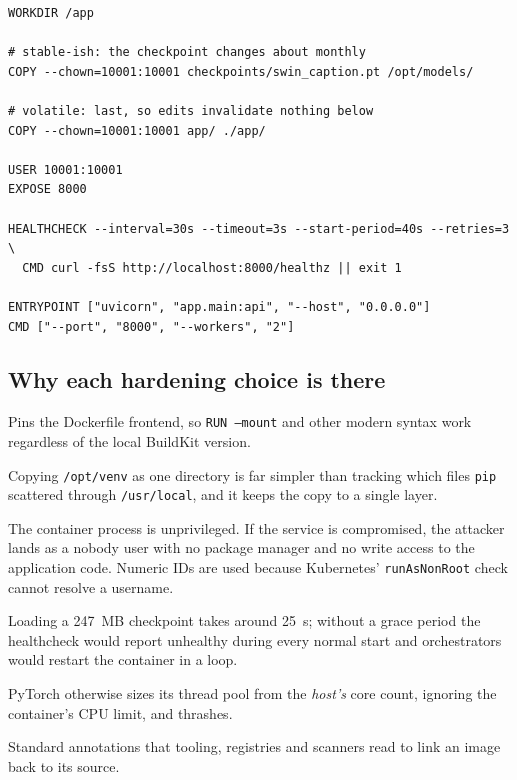 \documentclass[10pt,a4paper]{article}
\newcommand{\cmd}[1]{\texttt{\small #1}}
\begin{document}
\begin{lstlisting}[style=dfile,caption={\texttt{Dockerfile} --- the production build.}]
WORKDIR /app

# stable-ish: the checkpoint changes about monthly
COPY --chown=10001:10001 checkpoints/swin_caption.pt /opt/models/

# volatile: last, so edits invalidate nothing below
COPY --chown=10001:10001 app/ ./app/

USER 10001:10001
EXPOSE 8000

HEALTHCHECK --interval=30s --timeout=3s --start-period=40s --retries=3 \
  CMD curl -fsS http://localhost:8000/healthz || exit 1

ENTRYPOINT ["uvicorn", "app.main:api", "--host", "0.0.0.0"]
CMD ["--port", "8000", "--workers", "2"]
\end{lstlisting}

\subsection{Why each hardening choice is there}

\begin{description}[leftmargin=1.6em,style=nextline,itemsep=2pt]
\item[\texttt{\# syntax=} directive] Pins the Dockerfile frontend, so
  \texttt{RUN --mount} and other modern syntax work regardless of the
  local BuildKit version.
\item[A virtual environment] Copying \texttt{/opt/venv} as one directory
  is far simpler than tracking which files \cmd{pip} scattered through
  \texttt{/usr/local}, and it keeps the copy to a single layer.
\item[\texttt{USER 10001:10001}] The container process is unprivileged.
  If the service is compromised, the attacker lands as a nobody user
  with no package manager and no write access to the application code.
  Numeric IDs are used because Kubernetes' \texttt{runAsNonRoot} check
  cannot resolve a username.
\item[\texttt{--start-period=40s}] Loading a 247~MB checkpoint takes
  around 25~s; without a grace period the healthcheck would report
  unhealthy during every normal start and orchestrators would restart
  the container in a loop.
\item[\texttt{OMP\_NUM\_THREADS=2}] PyTorch otherwise sizes its thread
  pool from the \emph{host's} core count, ignoring the container's CPU
  limit, and thrashes.
\item[OCI labels] Standard annotations that tooling, registries and
  scanners read to link an image back to its source.
\end{description}
\end{document}
